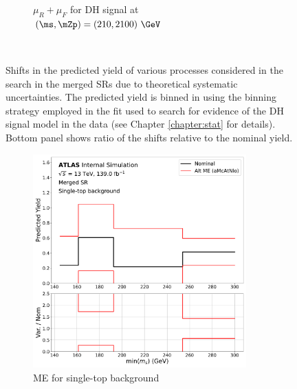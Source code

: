 \begin{figure}[!tb]
\begin{subfigure}{0.45\textwidth}
    \caption{\(\mu_R+\mu_F\) for DH signal at \((\ms, \mZp)=(210, 2100)~\GeV\)}
    \label{fig:DH_scale}
  \end{subfigure} \\ \vspace{1em}
      \caption{Shifts in the predicted yield of various processes considered in the search in the merged SRs due to theoretical systematic uncertainties. The predicted yield is binned in \minms using the binning strategy employed in the fit used to search for evidence of the DH signal model in the data (see Chapter \ref{chapter:stat} for details). Bottom panel shows ratio of the shifts relative to the nominal yield. }
  \label{fig:theory_systs}
  \end{figure}
  
 \begin{figure} \ContinuedFloat
  \begin{subfigure}{0.45\textwidth}
      \centering
    \includegraphics[width=0.9\textwidth]{Figures/6/2pt_AMcPy8_syst_stop_SR_mgd_TARJets10_minmS_mgd_yield.pdf}
    \caption{ME for single-top background}\label{fig:stop_ME}
    \end{subfigure} \hspace{1em}
   \begin{subfigure}{0.45\textwidth}
       \centering

\end{subfigure}
\end{figure}
